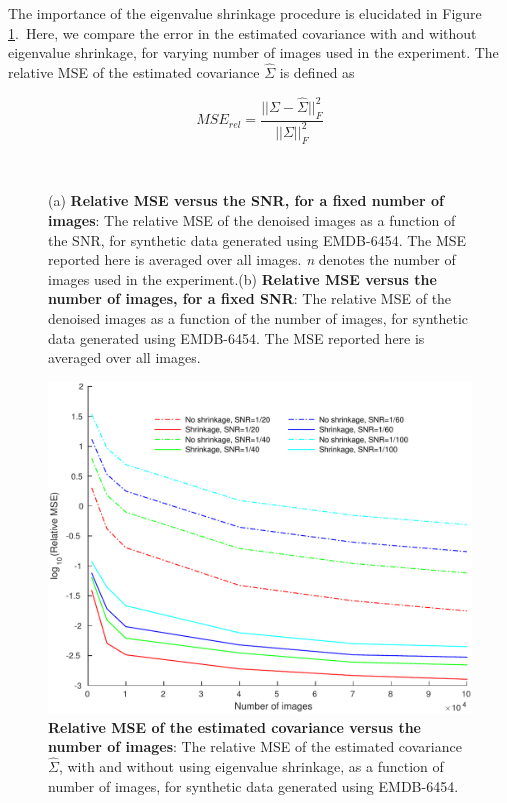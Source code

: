 The importance of the eigenvalue shrinkage procedure is elucidated in Figure \ref{fig:shrinkage}.\ Here,
we compare the error in the estimated covariance with and without eigenvalue shrinkage, for 
varying number of images used in the experiment. The relative MSE of the estimated covariance $\hat{\Sigma}$ is defined as

\begin{equation}
MSE_{rel} = \frac{||\Sigma-\hat{\Sigma}||_F^2}{||\Sigma||_F^2}
\end{equation}

\begin{figure}[]
\centering
{}\\
\caption{(a) \textbf{Relative MSE versus the SNR, for a fixed number of images}: 
The 
relative MSE of the denoised images as a function of the SNR, for synthetic 
data 
generated using EMDB-6454. The 
MSE reported here is averaged over all images. \textit{n} denotes the number of images 
used in the experiment.(b) \textbf{Relative MSE versus the number of images, for a fixed SNR}: 
The 
relative MSE of the denoised images as a function of the number of images, for 
synthetic data generated using EMDB-6454. The 
MSE reported here is averaged over all images. }
\end{figure}


\begin{figure}
\centering

\includegraphics[width=0.9\linewidth]{figures/cwf_shrinkage_compare}

\caption{\textbf{Relative MSE of the estimated covariance versus the number of images}: 
The 
relative MSE of the estimated covariance $\hat\Sigma$, with and without using eigenvalue shrinkage, as a function of number 
of images, for synthetic 
data 
generated using EMDB-6454.}
\label{fig:shrinkage}
\end{figure}

